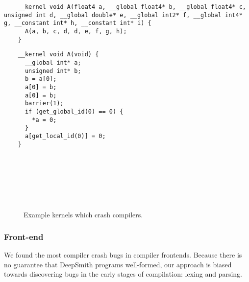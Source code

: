 \newsavebox{\NvidiaRecursionSegfault}
\begin{lrbox}{\NvidiaRecursionSegfault}
  \hspace{1.5em}
  \begin{lstlisting}
    __kernel void A(float4 a, __global float4* b, __global float4* c, unsigned int d, __global double* e, __global int2* f, __global int4* g, __constant int* h, __constant int* i) {
      A(a, b, c, d, d, e, f, g, h);
    }
  \end{lstlisting}
\end{lrbox}

\newsavebox{\XeonPhiSegfault}
\begin{lrbox}{\XeonPhiSegfault}
  \hspace{1.5em}
  \begin{lstlisting}
    __kernel void A(void) {
      __global int* a;
      unsigned int* b;
      b = a[0];
      a[0] = b;
      a[0] = b;
      barrier(1);
      if (get_global_id(0) == 0) {
        *a = 0;
      }
      a[get_local_id(0)] = 0;
    }
  \end{lstlisting}
\end{lrbox}

\begin{figure}
  \centering %
  \\%
  \\%
  \\%
  \\%
  \\%
  \caption{Example kernels which crash compilers.}%
  \label{lst:compiler-crashes}%
\end{figure}

\subsubsection{Front-end} We found the most compiler crash bugs in compiler frontends. Because there is no guarantee that DeepSmith programs well-formed, our approach is biased towards discovering bugs in the early stages of compilation: lexing and parsing.

